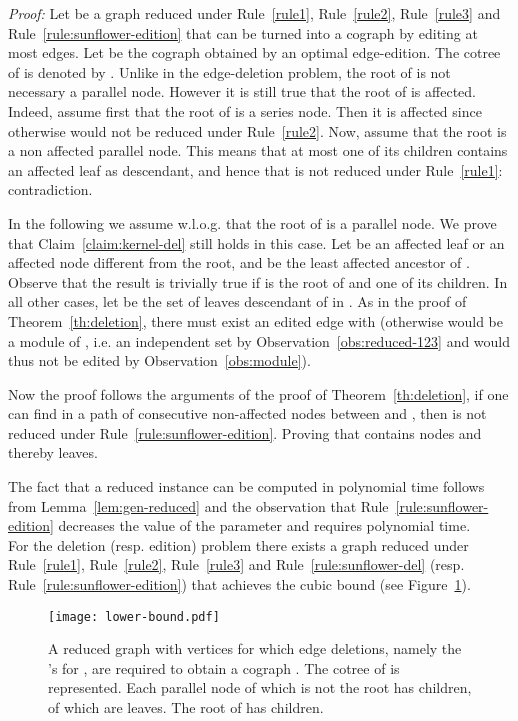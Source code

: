 \documentclass[11pt]{article}
\newenvironment{proof}{\noindent\textit{Proof: }}{{\hfill }}
\begin{document}
\begin{proof}
Let  be a graph reduced under Rule~\ref{rule1}, Rule~\ref{rule2}, Rule~\ref{rule3} and Rule~\ref{rule:sunflower-edition} that can be turned into a cograph by editing at most  edges. Let  be the cograph obtained by an optimal edge-edition. The cotree of  is denoted by . Unlike in the edge-deletion problem, the root of  is not necessary a parallel node. However it is still true that the root of  is affected. Indeed, assume first that the root of  is a series node. Then it is affected since otherwise  would not be reduced under Rule~\ref{rule2}. Now, assume that the root is a non affected parallel node. This means that at most one of its children contains an affected leaf as descendant, and hence that  is not reduced under Rule~\ref{rule1}: contradiction.

In the following we assume w.l.o.g. that the root of  is a parallel node. We prove that Claim~\ref{claim:kernel-del} still holds in this case.
Let  be an affected leaf or an affected node different from the root, and  be the least affected ancestor of . Observe that the result is trivially true if  is the root of  and  one of its children. In all other cases, let  be the set of leaves descendant of  in . As in the proof of Theorem~\ref{th:deletion}, there must exist an edited edge  with  (otherwise  would be a module of , i.e. an independent set by Observation~\ref{obs:reduced-123} and would thus not be edited by Observation~\ref{obs:module}). 

Now the proof follows the arguments of the proof of Theorem~\ref{th:deletion}, if one can find in  a path of  consecutive non-affected nodes between  and , then  is not reduced under Rule~\ref{rule:sunflower-edition}. Proving that  contains  nodes and thereby  leaves.

\medskip
The fact that a reduced instance can be computed in polynomial time follows from Lemma~\ref{lem:gen-reduced} and the observation that Rule~\ref{rule:sunflower-edition} decreases the value of the parameter and requires polynomial time.
\end{proof}\\

For the deletion (resp. edition) problem there exists a graph reduced under Rule~\ref{rule1}, Rule~\ref{rule2}, Rule~\ref{rule3} and Rule~\ref{rule:sunflower-del} (resp. Rule~\ref{rule:sunflower-edition}) that achieves the cubic bound (see Figure~\ref{fig:lower-bound}).

\begin{figure}[ht]
\centerline{\texttt{[image: lower-bound.pdf]}}
\caption{A reduced graph  with  vertices for which  edge deletions, namely the 's for , are required to obtain a cograph . The cotree  of  is represented. Each parallel node of   which is not the root has  children,  of which are leaves. The root of  has  children.
\label{fig:lower-bound}}
\end{figure}
\end{document}
